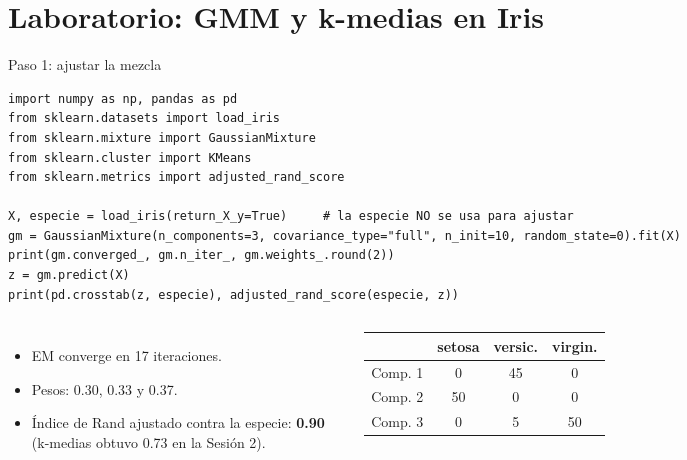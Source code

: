 \section{Laboratorio: GMM y k-medias en Iris}

\begin{frame}[fragile]{Paso 1: ajustar la mezcla}
\begin{lstlisting}
import numpy as np, pandas as pd
from sklearn.datasets import load_iris
from sklearn.mixture import GaussianMixture
from sklearn.cluster import KMeans
from sklearn.metrics import adjusted_rand_score

X, especie = load_iris(return_X_y=True)     # la especie NO se usa para ajustar
gm = GaussianMixture(n_components=3, covariance_type="full", n_init=10, random_state=0).fit(X)
print(gm.converged_, gm.n_iter_, gm.weights_.round(2))
z = gm.predict(X)
print(pd.crosstab(z, especie), adjusted_rand_score(especie, z))
\end{lstlisting}
  \begin{columns}[T]
    \small
    \begin{itemize}
      \item EM converge en 17 iteraciones.
      \item Pesos: 0.30, 0.33 y 0.37.
      \item Índice de Rand ajustado contra la especie: \textbf{0.90}
            (k-medias obtuvo 0.73 en la Sesión 2).
    \end{itemize}
    \small
    \centering
    \begin{tabular}{@{}lccc@{}}
      & \textbf{setosa} & \textbf{versic.} & \textbf{virgin.}\\
      \midrule
      Comp. 1 & 0 & 45 & 0 \\
      Comp. 2 & 50 & 0 & 0 \\
      Comp. 3 & 0 & 5 & 50 \\
    \end{tabular}
  \end{columns}
\end{frame}

